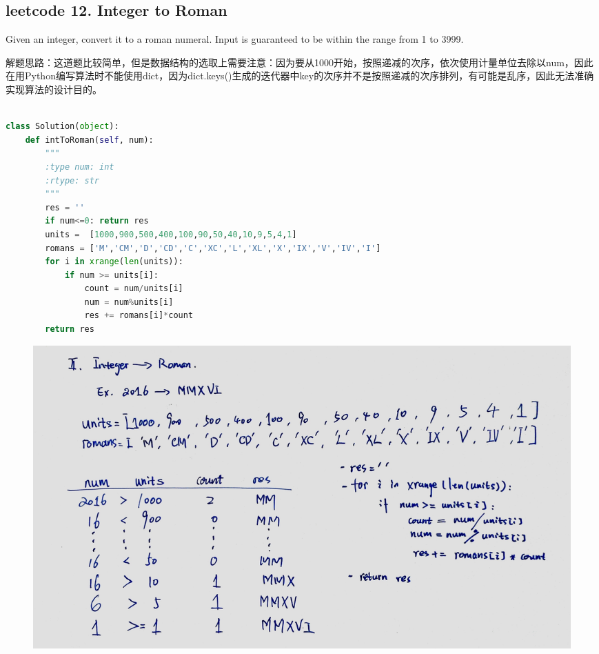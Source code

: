 \documentclass[a4paper,10pt]{article}
\begin{document}
\subsection{leetcode 12. Integer to Roman}
Given an integer, convert it to a roman numeral. Input is guaranteed to be within the range from 1 to 3999. \\

\begin{CJK*}{UTF8}{gbsn}
\noindent 解题思路：这道题比较简单，但是数据结构的选取上需要注意：因为要从1000开始，按照递减的次序，依次使用计量单位去除以num，因此在用Python编写算法时不能使用dict，因为dict.keys()生成的迭代器中key的次序并不是按照递减的次序排列，有可能是乱序，因此无法准确实现算法的设计目的。\\
\end{CJK*}

\begin{lstlisting}[language=Python, caption=Problem12. Integer to Roman]

class Solution(object):
    def intToRoman(self, num):
        """
        :type num: int
        :rtype: str
        """
        res = ''
        if num<=0: return res
        units =  [1000,900,500,400,100,90,50,40,10,9,5,4,1]
        romans = ['M','CM','D','CD','C','XC','L','XL','X','IX','V','IV','I']
        for i in xrange(len(units)):
            if num >= units[i]:
                count = num/units[i]
                num = num%units[i]
                res += romans[i]*count
        return res
\end{lstlisting}

\begin{figure}[h]
    \includegraphics[width=\textwidth]{leetcode12.jpg}
    \centering\\
\end{figure}
\end{document}
